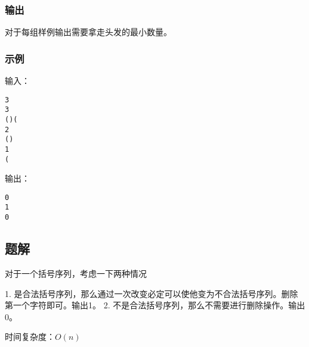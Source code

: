 \subsubsection{输出}
对于每组样例输出需要拿走头发的最小数量。

\subsubsection{示例}
输入：
\begin{lstlisting}
3
3
()(
2
()
1
(
\end{lstlisting}

输出：
\begin{lstlisting}
0
1
0
\end{lstlisting}

\subsection{题解}

对于一个括号序列，考虑一下两种情况

1. 是合法括号序列，那么通过一次改变必定可以使他变为不合法括号序列。删除第一个字符即可。输出1。
2. 不是合法括号序列，那么不需要进行删除操作。输出0。

时间复杂度：$O(n)$


